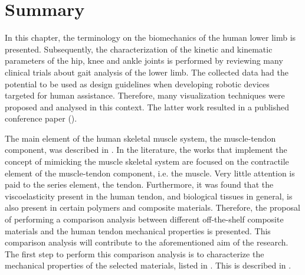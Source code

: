 \section{Summary}

In this chapter, the terminology on the biomechanics of the human lower limb is presented. Subsequently, the characterization of the kinetic and kinematic parameters of the hip, knee and ankle joints is performed by reviewing many clinical trials about gait analysis of the lower limb. The collected data had the potential to be used as design guidelines when developing robotic devices targeted for human assistance. Therefore, many visualization techniques were proposed and analysed in this context. The latter work resulted in a published conference paper (). 

The main element of the human skeletal muscle system, the muscle-tendon component, was described in . In the literature, the works that implement the concept of mimicking the muscle skeletal system are focused on the contractile element of the muscle-tendon component, i.e. the muscle. Very little attention is paid to the series element, the tendon. Furthermore, it was found that the viscoelasticity present in the human tendon, and biological tissues in general, is also present in certain polymers and composite materials. Therefore, the proposal of performing a comparison analysis between different off-the-shelf composite materials and the human tendon mechanical properties is presented. This comparison analysis will contribute to the aforementioned aim of the research. The first step to perform this comparison analysis is to characterize the mechanical properties of the selected materials, listed in . This is described in .

